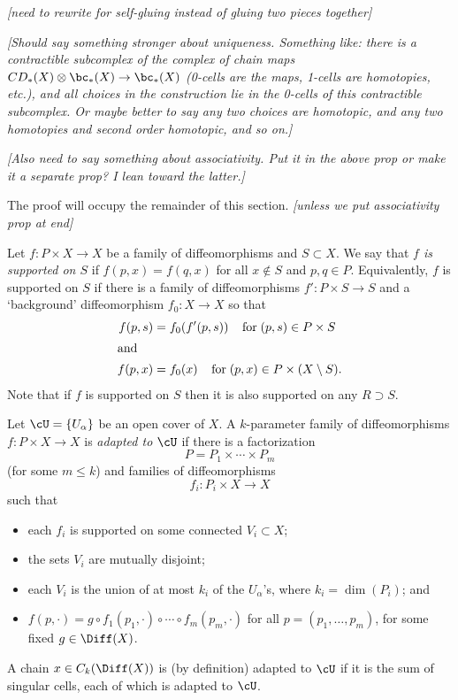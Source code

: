 \documentclass[11pt,leqno]{amsart}
\def\sub{\subset}
\def\sup{\supset}
\def\setmin{\setminus}
\def\nn#1{{{\it \small [#1]}}}
\newcommand{\eq}[1]{\begin{displaymath}#1\end{displaymath}}
\begin{document}
\nn{need to rewrite for self-gluing instead of gluing two pieces together}

\nn{Should say something stronger about uniqueness.
Something like: there is
a contractible subcomplex of the complex of chain maps
$CD_*(X) \otimes \bc_*(X) \to \bc_*(X)$ (0-cells are the maps, 1-cells are homotopies, etc.),
and all choices in the construction lie in the 0-cells of this
contractible subcomplex.
Or maybe better to say any two choices are homotopic, and
any two homotopies and second order homotopic, and so on.}

\nn{Also need to say something about associativity.
Put it in the above prop or make it a separate prop?
I lean toward the latter.}
\medskip

The proof will occupy the remainder of this section.
\nn{unless we put associativity prop at end}

\medskip

Let $f: P \times X \to X$ be a family of diffeomorphisms and $S \sub X$.
We say that {\it $f$ is supported on $S$} if $f(p, x) = f(q, x)$ for all
$x \notin S$ and $p, q \in P$. Equivalently, $f$ is supported on $S$ if there is a family of diffeomorphisms $f' : P \times S \to S$ and a `background'
diffeomorphism $f_0 : X \to X$ so that
\begin{align}
	f(p,s) & = f_0(f'(p,s)) \;\;\;\; \mbox{for}\; (p, s) \in P\times S \\
\intertext{and}
	f(p,x) & = f_0(x) \;\;\;\; \mbox{for}\; (p, x) \in {P \times (X \setmin S)}.
\end{align}
Note that if $f$ is supported on $S$ then it is also supported on any $R \sup S$.

Let $\cU = \{U_\alpha\}$ be an open cover of $X$.
A $k$-parameter family of diffeomorphisms $f: P \times X \to X$ is
{\it adapted to $\cU$} if there is a factorization
\eq{
    P = P_1 \times \cdots \times P_m
}
(for some $m \le k$)
and families of diffeomorphisms
\eq{
    f_i :  P_i \times X \to X
}
such that
\begin{itemize}
\item each $f_i$ is supported on some connected $V_i \sub X$;
\item the sets $V_i$ are mutually disjoint;
\item each $V_i$ is the union of at most $k_i$ of the $U_\alpha$'s,
where $k_i = \dim(P_i)$; and
\item $f(p, \cdot) = g \circ f_1(p_1, \cdot) \circ \cdots \circ f_m(p_m, \cdot)$
for all $p = (p_1, \ldots, p_m)$, for some fixed $g \in \Diff(X)$.
\end{itemize}
A chain $x \in C_k(\Diff(X))$ is (by definition) adapted to $\cU$ if it is the sum
of singular cells, each of which is adapted to $\cU$.
\end{document}
